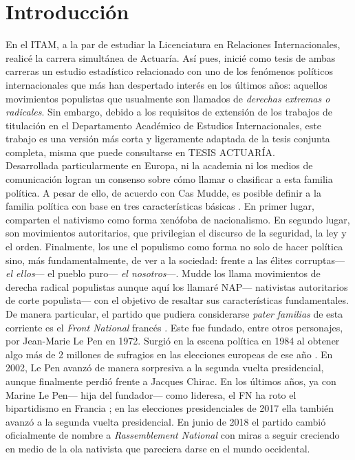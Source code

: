 \chapter*{Introducción}

En el ITAM, a la par de estudiar la Licenciatura en Relaciones Internacionales, realicé la carrera simultánea de Actuaría. Así pues, inicié como tesis de ambas carreras un estudio estadístico relacionado con uno de los fenómenos políticos internacionales que más han despertado interés en los últimos años: aquellos movimientos populistas que usualmente son llamados de \textit{derechas extremas o radicales}. Sin embargo, debido a los requisitos de extensión de los trabajos de titulación en el Departamento Académico de Estudios Internacionales, este trabajo es una versión más corta y ligeramente adaptada de la tesis conjunta completa, misma que puede consultarse en {\color{Red} TESIS ACTUARÍA}.\\  

Desarrollada particularmente en Europa, ni la academia ni los medios de comunicación logran un consenso sobre cómo llamar o clasificar a esta familia política. A pesar de ello, de acuerdo con Cas Mudde, es posible definir a la familia política con base en tres características básicas \parencites{Mudde07a}{Beauchamp16a}. En primer lugar, comparten el nativismo como forma xenófoba de nacionalismo. En segundo lugar, son movimientos autoritarios, que privilegian el discurso de la seguridad, la ley y el orden. Finalmente, los une el populismo como forma no solo de hacer política sino, más fundamentalmente, de ver a la sociedad: frente a las élites corruptas--- \textit{el ellos}--- el pueblo puro--- \textit{el nosotros}---. Mudde los llama movimientos de derecha radical populistas aunque aquí los llamaré NAP--- nativistas autoritarios de corte populista--- con el objetivo de resaltar sus características fundamentales.\\

De manera particular, el partido que pudiera considerarse \textit{pater familias} de esta corriente es el \textit{Front National} francés \parencite{Mudde07a}. Este fue fundado, entre otros personajes, por Jean-Marie Le Pen en 1972. Surgió en la escena política en 1984 al obtener algo más de 2 millones de sufragios en las elecciones europeas de ese año \parencite{LeBras15}. En 2002, Le Pen avanzó de manera sorpresiva a la segunda vuelta presidencial, aunque finalmente perdió frente a Jacques Chirac. En los últimos años, ya con Marine Le Pen--- hija del fundador--- como lideresa, el FN ha roto el bipartidismo en Francia \parencite{LeBras16};  en las elecciones presidenciales de 2017 ella también avanzó a la segunda vuelta presidencial. En junio de 2018 el partido cambió oficialmente de nombre a \textit{Rassemblement National} con miras a seguir creciendo en medio de la ola nativista que pareciera darse en el mundo occidental.\\

